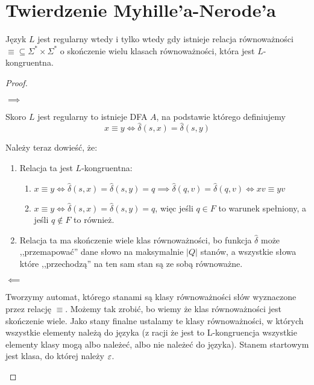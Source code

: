 \section{Twierdzenie Myhille'a-Nerode'a}

\begin{theorem}
    Język \( L \) jest regularny wtedy i tylko wtedy gdy
    istnieje relacja równoważności \( \equiv \subseteq \Sigma^* \times \Sigma^*\) o skończenie wielu klasach równoważności, która jest \(L\)-kongruentna.
\end{theorem}
\begin{proof} \( \)
    \begin{description}
        \item \( \implies \)
        
        Skoro \( L \) jest regularny to istnieje DFA \( A \), na podstawie którego definiujemy
        \[
            x \equiv y \iff \hat \delta(s, x) = \hat \delta(s, y)
        \]
        
        Należy teraz dowieść, że:
        
        \begin{enumerate}
            \item Relacja ta jest \(L\)-kongruentna: \begin{enumerate}
                \item \(x \equiv y \iff \hat \delta(s, x) = \hat \delta(s, y) = q \implies  \hat \delta(q, v) = \hat \delta(q, v) \iff xv \equiv yv\)
                \item \(x \equiv y \iff \hat \delta(s, x) = \hat \delta(s, y) = q \), więc jeśli \(q \in F\) to warunek spełniony, a jeśli \(q \not \in F\) to również. 
        
            \end{enumerate} 
            
            \item Relacja ta ma skończenie wiele klas równoważności, bo funkcja \( \hat \delta \) może ,,przemapować'' dane słowo na maksymalnie \( |Q| \) stanów, a wszystkie słowa które ,,przechodzą'' na ten sam stan są ze sobą równoważne. 
            
        \end{enumerate}
        
        \item \( \impliedby \)
        
        Tworzymy automat, którego stanami są klasy równoważności słów wyznaczone przez relację \( \equiv \). Możemy tak zrobić, bo wiemy że klas równoważności jest skończenie wiele. Jako stany finalne ustalamy te klasy równoważności, w których wszystkie elementy należą do języka (z racji że jest to L-kongruencja wszystkie elementy klasy mogą albo należeć, albo nie należeć do języka). Stanem startowym jest klasa, do której należy \( \varepsilon \). 
        

\end{description}
\end{proof}
